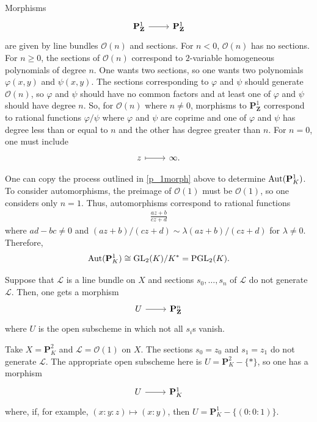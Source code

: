 \documentclass [11 pt, oneside] {article}
\begin{document}
\begin{example}[ ]\label{p_1morph}\text{}
Morphisms
\[
\begin{tikzcd}
	\mathbf{P}^1_\mathbf{Z}\ar[r]&\mathbf{P}^1_\mathbf{Z}
\end{tikzcd}
\]
are given by line bundles $\mathscr{O}(n)$ and sections. For $n<0$, $\mathscr{O}(n)$ has no sections. For $n\ge 0$, the sections of $\mathscr{O}(n) $ correspond to $2$-variable homogeneous polynomials of degree $n$. 
One wants two sections, so one wants two polynomials $\varphi(x,y)$ and $\psi(x,y)$. The sections corresponding to $\varphi$ and $\psi$ should generate $\mathscr{O}(n)$, so $\varphi$ and $\psi$ should have no common factors and at least one of $\varphi$ and $\psi$ should have degree $n$.
So, for $\mathscr{O}(n)$ where $n\ne 0$, morphisms to $\mathbf{P}^1_\mathbf{Z}$ correspond to rational functions $\varphi/\psi$ where $\varphi$ and $\psi$ are coprime and one of $\varphi$ and $\psi$ has degree less than or equal to $n$ and the other has degree greater than $n$. 
For $n=0$, one must include
\[
\begin{tikzcd}
	z\ar[r,mapsto]&\infty.
\end{tikzcd}
\]
\end{example}

\begin{example}[ ]\label{}\text{}
One can copy the process outlined in \cref{p_1morph} above to determine $\operatorname{Aut}(\mathbf{P}^1_K)$.
To consider automorphisms, the preimage of $\mathscr{O}(1)$ must be $\mathscr{O}(1)$, so one considers only $n=1$. Thus, automorphisms correspond to rational functions
\begin{align*}
	\frac{az+b}{cz+d}
\end{align*}
where $ad-bc\ne 0$ and $(az+b)/ (cz+d) \sim \lambda (az+b) /(cz+d)$ for $\lambda\ne 0$. Therefore,
\begin{align*}
	\operatorname{Aut}(\mathbf{P}^1_K)\cong \operatorname{GL}_{2}(K)/K^* = \operatorname{PGL}_{2}(K).
\end{align*}
\end{example}

Suppose that $\mathscr{L}$ is a line bundle on $X$ and sections $s_0,\hdots, s_n$ of $\mathscr{L}$ do not generate $\mathscr{L}$. Then, one gets a morphism 
\[
\begin{tikzcd}
	U\ar[r]& \mathbf{P}^n_\mathbf{Z}
\end{tikzcd}
\]
where $U$ is the open subscheme in which not all $s_i$s vanish.
\begin{example}[ ]\label{}\text{}
Take $X= \mathbf{P}^2_K$ and $\mathscr{L}=\mathscr{O}(1)$ on $X$.
The sections $s_0=z_0$ and $s_1=z_1$ do not generate $\mathscr{L}$. The appropriate open subscheme here is $U = \mathbf{P}^2_K - \{ *\}$, so one has a morphism
\[
\begin{tikzcd}
	U\ar[r]&\mathbf{P}^1_K
\end{tikzcd}
\]
where, if, for example, $(x:y:z)\longmapsto  (x:y)$, then $U = \mathbf{P}^1_K - \{(0:0:1)\}$.
\end{example}
\end{document}
